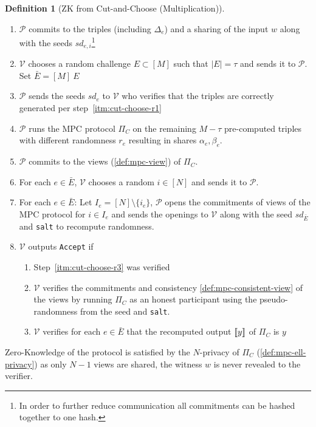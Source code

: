 \documentclass[twoside,11pt]{report}
\theoremstyle{definition}
\newtheorem{definition}{Definition}[section]
\theoremstyle{plain}
\begin{document}
\begin{definition}[ZK from Cut-and-Choose (Multiplication)]
\begin{enumerate}[itemsep=0pt, parsep=0pt]
\begin{enumerate}[nolistsep]
    \end{enumerate}
    \item $\mathcal{P}$ commits to the triples (including $\Delta_e$) and a sharing of the input $w$ along with the seeds $sd_{e,i}$\footnote{In order to further reduce communication all commitments can be hashed together to one hash.}
    \item $\mathcal{V}$ chooses a random challenge $E \subset [M]$ such that $|E| = \tau$ and sends it to $\mathcal{P}$. Set $\bar{E} = [M] \ E$
          \item\label{itm:cut-choose-r3} $\mathcal{P}$ sends the seeds $sd_e$ to $\mathcal{V}$ who verifies that the triples are correctly generated per step~\ref{itm:cut-choose-r1}
    \item $\mathcal{P}$ runs the MPC protocol $\Pi_C$ on the remaining $M-\tau$ pre-computed triples with different randomness $r_e$ resulting in shares $\alpha_e, \beta_e$.
    \item $\mathcal{P}$ commits to the views (\autoref{def:mpc-view}) of $\Pi_C$.
    \item For each $e \in \bar{E}$, $\mathcal{V}$ chooses a random $i \in [N]$ and sends it to $\mathcal{P}$.
    \item For each $e \in \bar{E}$: Let $I_e = [N] \setminus \{i_e\}$, $\mathcal{P}$ opens the commitments of views of the MPC protocol for $i \in I_e$ and sends the openings to $\mathcal{V}$ along with the seed $sd_{\bar{E}}$ and \texttt{salt} to recompute randomness.
    \item $\mathcal{V}$ outputs \texttt{Accept} if
          \begin{enumerate}[nolistsep]
            \item Step~\ref{itm:cut-choose-r3} was verified
            \item $\mathcal{V}$ verifies the commitments and consistency \autoref{def:mpc-consistent-view} of the views by running $\Pi_C$ as an honest participant using the pseudo-randomness from the seed and \texttt{salt}.
            \item $\mathcal{V}$ verifies for each $e \in \bar{E}$ that the recomputed output $\llbracket y \rrbracket$ of $\Pi_C$ is $y$
          \end{enumerate}
  \end{enumerate}
\end{definition}

Zero-Knowledge of the protocol is satisfied by the $N$-privacy of $\Pi_C$ (\autoref{def:mpc-ell-privacy}) as only $N-1$ views are shared, the witness $w$ is never revealed to the verifier.
\end{document}

